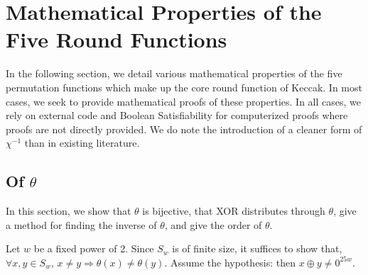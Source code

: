 \documentclass[10pt,twocolumn,twoside]{pnas-new}
\begin{document}








\section{Mathematical Properties of the Five Round Functions} \label{sec:properties}

In the following section, we detail various mathematical properties of the five
permutation functions which make up the core round function of Keccak. In most
cases, we seek to provide mathematical proofs of these properties. In all
cases, we rely on external code and Boolean Satisfiability for computerized
proofs where proofs are not directly provided. We do note the introduction of
a cleaner form of $\chi^{-1}$ than in existing literature.


\subsection{Of $\theta$} \label{sec:p:t}


In this section, we show that $\theta$ is bijective, that XOR distributes
through $\theta$, give a method for finding the inverse of $\theta$, and
give the order of $\theta$.

Let $w$ be a fixed power of 2. Since $S_{w}$ is of finite size, it suffices to
show that, $\forall x, y \in S_{w}$,
$x \neq y \Rightarrow \theta(x) \neq \theta(y)$. Assume the hypothesis: then
$x \oplus y \neq 0^{25w}$.
\end{document}
